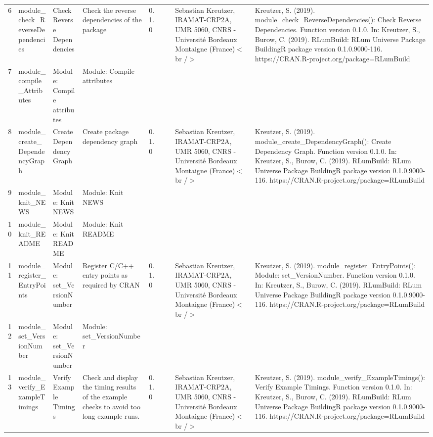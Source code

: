 \begin{table}[ht]
\begin{tabular}{rllllllll}
 \\ 
  6 & module\_check\_ReverseDependencies & Check Reverse Dependencies & Check the reverse dependencies of the package & 0.1.0
 &  &  & Sebastian Kreutzer, IRAMAT-CRP2A, UMR 5060, CNRS - Université Bordeaux Montaigne (France)$<$br /$>$ & Kreutzer, S. (2019). module\_check\_ReverseDependencies(): Check Reverse Dependencies. Function version 0.1.0. In: Kreutzer, S., Burow, C. (2019). RLumBuild: RLum Universe Package BuildingR package version 0.1.0.9000-116. https://CRAN.R-project.org/package=RLumBuild
 \\ 
  7 & module\_compile\_Attributes & Module: Compile attributes & Module: Compile attributes &  &  &  &  &  \\ 
  8 & module\_create\_DependencyGraph & Create Dependency Graph & Create package dependency graph & 0.1.0
 &  &  & Sebastian Kreutzer, IRAMAT-CRP2A, UMR 5060, CNRS - Université Bordeaux Montaigne (France)$<$br /$>$ & Kreutzer, S. (2019). module\_create\_DependencyGraph(): Create Dependency Graph. Function version 0.1.0. In: Kreutzer, S., Burow, C. (2019). RLumBuild: RLum Universe Package BuildingR package version 0.1.0.9000-116. https://CRAN.R-project.org/package=RLumBuild
 \\ 
  9 & module\_knit\_NEWS & Module: Knit NEWS & Module: Knit NEWS &  &  &  &  &  \\ 
  10 & module\_knit\_README & Module: Knit README & Module: Knit README &  &  &  &  &  \\ 
  11 & module\_register\_EntryPoints & Module: set\_VersionNumber & Register C/C++ entry points as required by CRAN & 0.1.0
 &  &  & Sebastian Kreutzer, IRAMAT-CRP2A, UMR 5060, CNRS - Université Bordeaux Montaigne (France)$<$br /$>$ & Kreutzer, S. (2019). module\_register\_EntryPoints(): Module: set\_VersionNumber. Function version 0.1.0. In: Kreutzer, S., Burow, C. (2019). RLumBuild: RLum Universe Package BuildingR package version 0.1.0.9000-116. https://CRAN.R-project.org/package=RLumBuild
 \\ 
  12 & module\_set\_VersionNumber & Module: set\_VersionNumber & Module: set\_VersionNumber &  &  &  &  &  \\ 
  13 & module\_verify\_ExampleTimings & Verify Example Timings & Check and display the timing results of the example checks to avoid too long example runs. & 0.1.0
 &  &  & Sebastian Kreutzer, IRAMAT-CRP2A, UMR 5060, CNRS - Université Bordeaux Montaigne (France)$<$br /$>$ & Kreutzer, S. (2019). module\_verify\_ExampleTimings(): Verify Example Timings. Function version 0.1.0. In: Kreutzer, S., Burow, C. (2019). RLumBuild: RLum Universe Package BuildingR package version 0.1.0.9000-116. https://CRAN.R-project.org/package=RLumBuild

\end{tabular}
\end{table}
